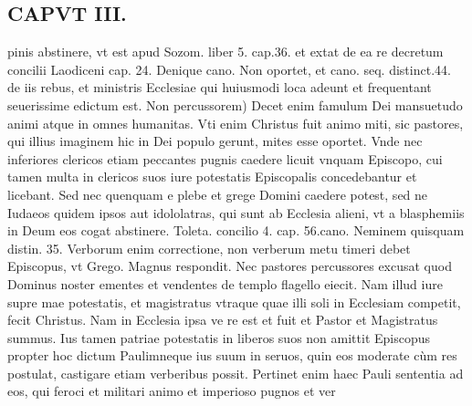 \documentclass{article}
\begin{document}
\begin{pages}
\section*{CAPVT  III. }
\marginpar{[ p.133 ]}\pstart pinis abstinere, vt est apud Sozom. liber 5. cap.36. et extat de ea re decretum concilii Laodiceni cap. 24. Denique cano. Non oportet, et cano. seq. distinct.44. de iis rebus, et ministris Ecclesiae qui huiusmodi loca adeunt et frequentant seuerissime edictum est.  \pend\pstart Non percussorem) Decet enim famulum Dei mansuetudo animi atque in omnes humanitas. Vti enim Christus fuit animo miti, sic pastores, qui illius imaginem hic in Dei populo gerunt, mites esse oportet. Vnde nec inferiores clericos etiam peccantes pugnis caedere licuit vnquam Episcopo, cui tamen multa in clericos suos iure potestatis Episcopalis concedebantur et licebant. Sed nec quenquam e plebe et grege Domini caedere potest, sed ne Iudaeos quidem ipsos aut idololatras, qui sunt ab Ecclesia alieni, vt a blasphemiis in Deum eos cogat abstinere. Toleta. concilio 4. cap. 56.cano. Neminem quisquam distin. 35. Verborum enim correctione, non verberum metu timeri debet Episcopus, vt Grego. Magnus respondit. Nec pastores percussores excusat quod Dominus noster ementes et vendentes de templo flagello eiecit. Nam illud iure supre mae potestatis, et magistratus vtraque  quae illi soli in Ecclesiam competit, fecit Christus. Nam in Ecclesia ipsa ve re est et fuit et Pastor et Magistratus summus. Ius tamen patriae potestatis in liberos suos non amittit Episcopus propter hoc dictum Paulimneque ius suum in seruos, quin eos moderate cùm res postulat, castigare etiam verberibus possit. Pertinet enim haec Pauli sententia ad eos, qui feroci et militari animo et imperioso pugnos et ver\pend

\end{pages}
\end{document}
